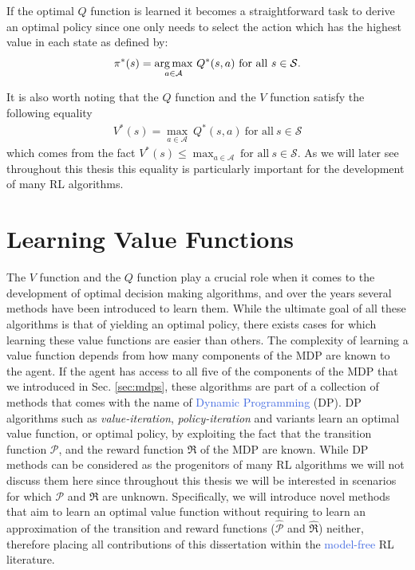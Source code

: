 If the optimal $Q$ function is learned it becomes a straightforward task to derive an optimal policy since one only needs to select the action which has the highest value in each state as defined by:
\begin{equation}
	\pi^{*}(s) = \underset{a\in\mathcal{A}}{\operatorname*{arg\,max}} \ Q^{*}(s,a) \ \text{for all} \ s \in \mathcal{S}.
\end{equation}

It is also worth noting that the $Q$ function and the $V$ function satisfy the following equality
\begin{align}
	V^{*}(s) = \underset{a\in\mathcal{A}}{\max} \ Q^{*}(s,a) \ \text{for all} \ s \in \mathcal{S}
\end{align}
which comes from the fact $V^{*}(s) \leq \max_{a\in\mathcal{A}} \ \text{for all} \ s\in\mathcal{S}$. As we will later see throughout this thesis this equality is particularly important for the development of many RL algorithms.


\section{Learning Value Functions}
\label{sec:learning_value_functions}
The $V$ function and the $Q$ function play a crucial role when it comes to the development of optimal decision making algorithms, and over the years several methods have been introduced to learn them. While the ultimate goal of all these algorithms is that of yielding an optimal policy, there exists cases for which learning these value functions are easier than others. The complexity of learning a value function depends from how many components of the MDP are known to the agent. If the agent has access to all five of the components of the MDP that we introduced in Sec. \ref{sec:mdps}, these algorithms are part of a collection of methods that comes with the name of \textcolor{RoyalBlue}{Dynamic Programming} (DP). DP algorithms such as \textit{value-iteration}, \textit{policy-iteration} and variants \cite{bertsekas2015value,wei2015value} learn an optimal value function, or optimal policy, by exploiting the fact that the transition function $\mathcal{P}$, and the reward function $\Re$ of the MDP are known. While DP methods can be considered as the progenitors of many RL algorithms we will not discuss them here since throughout this thesis we will be interested in scenarios for which $\mathcal{P}$ and $\Re$ are unknown. Specifically, we will introduce novel methods that aim to learn an optimal value function without requiring to learn an approximation of the transition and reward functions ($\widehat{\mathcal{P}}$ and $\widehat{\mathcal{\Re}}$) neither, therefore placing all contributions of this dissertation within the \textcolor{RoyalBlue}{model-free} RL literature. 

